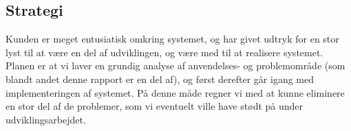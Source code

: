 \documentclass{article}
\begin{document}
\subsection{Strategi}
Kunden er meget entusiatisk omkring systemet, og har givet udtryk for en stor lyst til at være en del af udviklingen, og være med til at realisere systemet. Planen er at vi laver en grundig analyse af anvendelses- og problemområde (som blandt andet denne rapport er en del af), og først derefter går igang med implementeringen af systemet. På denne måde regner vi med at kunne eliminere en stor del af de problemer, som vi eventuelt ville have stødt på under udviklingsarbejdet.
\end{document}
